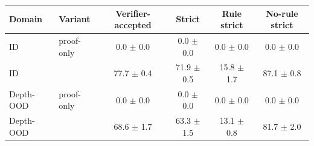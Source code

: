 \begin{tabular}{llcccc}
\toprule
Domain & Variant & Verifier-accepted & Strict & Rule strict & No-rule strict \\
\midrule
ID & proof-only & 0.0 $\pm$ 0.0 & 0.0 $\pm$ 0.0 & 0.0 $\pm$ 0.0 & 0.0 $\pm$ 0.0 \\
ID & \model{} & 77.7 $\pm$ 0.4 & 71.9 $\pm$ 0.5 & 15.8 $\pm$ 1.7 & 87.1 $\pm$ 0.8 \\
\midrule
Depth-OOD & proof-only & 0.0 $\pm$ 0.0 & 0.0 $\pm$ 0.0 & 0.0 $\pm$ 0.0 & 0.0 $\pm$ 0.0 \\
Depth-OOD & \model{} & 68.6 $\pm$ 1.7 & 63.3 $\pm$ 1.5 & 13.1 $\pm$ 0.8 & 81.7 $\pm$ 2.0 \\
\bottomrule
\end{tabular}
